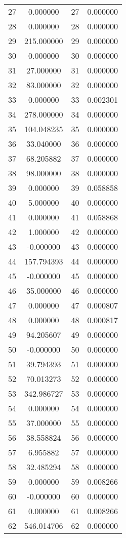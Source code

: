 \documentclass[12pt]{article}
\begin{document}
\begin{longtable}{@{}cccc@{}}
27 & 0.000000 & 27 & 0.000000 \\
28 & 0.000000 & 28 & 0.000000 \\
29 & 215.000000 & 29 & 0.000000 \\
30 & 0.000000 & 30 & 0.000000 \\
31 & 27.000000 & 31 & 0.000000 \\
32 & 83.000000 & 32 & 0.000000 \\
33 & 0.000000 & 33 & 0.002301 \\
34 & 278.000000 & 34 & 0.000000 \\
35 & 104.048235 & 35 & 0.000000 \\
36 & 33.040000 & 36 & 0.000000 \\
37 & 68.205882 & 37 & 0.000000 \\
38 & 98.000000 & 38 & 0.000000 \\
39 & 0.000000 & 39 & 0.058858 \\
40 & 5.000000 & 40 & 0.000000 \\
41 & 0.000000 & 41 & 0.058868 \\
42 & 1.000000 & 42 & 0.000000 \\
43 & -0.000000 & 43 & 0.000000 \\
44 & 157.794393 & 44 & 0.000000 \\
45 & -0.000000 & 45 & 0.000000 \\
46 & 35.000000 & 46 & 0.000000 \\
47 & 0.000000 & 47 & 0.000807 \\
48 & 0.000000 & 48 & 0.000817 \\
49 & 94.205607 & 49 & 0.000000 \\
50 & -0.000000 & 50 & 0.000000 \\
51 & 39.794393 & 51 & 0.000000 \\
52 & 70.013273 & 52 & 0.000000 \\
53 & 342.986727 & 53 & 0.000000 \\
54 & 0.000000 & 54 & 0.000000 \\
55 & 37.000000 & 55 & 0.000000 \\
56 & 38.558824 & 56 & 0.000000 \\
57 & 6.955882 & 57 & 0.000000 \\
58 & 32.485294 & 58 & 0.000000 \\
59 & 0.000000 & 59 & 0.008266 \\
60 & -0.000000 & 60 & 0.000000 \\
61 & 0.000000 & 61 & 0.008266 \\
62 & 546.014706 & 62 & 0.000000 \\

\end{longtable}
\end{document}
